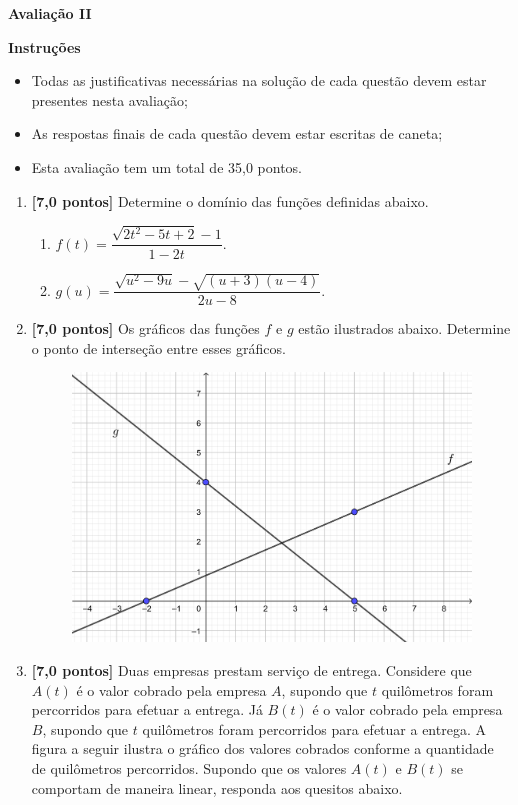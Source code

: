 \documentclass[12pt,a4paper]{article}
\begin{document}
\begin{center}
 \textbf{Avaliação II}
\end{center}

\textbf{Instruções}
\begin{itemize}
 \item Todas as justificativas necessárias na solução de cada questão devem estar presentes nesta avaliação;
 \item As respostas finais de cada questão devem estar escritas de caneta;
 \item Esta avaliação tem um total de 35,0 pontos.
\end{itemize}

\begin{enumerate}
  \item \textbf{[7,0 pontos]} Determine o domínio das funções definidas abaixo.
  \begin{enumerate}
    \item $f(t) = \dfrac{\sqrt{2t^2 - 5t + 2} - 1}{1 - 2t}$.
    \item $g(u) = \dfrac{\sqrt{u^2 - 9u} - \sqrt{(u + 3)(u - 4)}}{2u - 8}$.
  \end{enumerate}
  
  \item \textbf{[7,0 pontos]} Os gráficos das funções $f$ e $g$ estão ilustrados abaixo. Determine o ponto de interseção entre esses gráficos.
  
    \begin{figure}[H]
     \centering
     \includegraphics[scale=0.6]{figura/grafico-avaliacao-ii-cc-20-1.png}
    \end{figure}
  
  \item \textbf{[7,0 pontos]} Duas empresas prestam serviço de entrega. Considere que $A(t)$ é o valor
    cobrado pela empresa $A$, supondo que $t$ quilômetros foram percorridos para
    efetuar a entrega. Já $B(t)$ é o valor cobrado pela empresa $B$, supondo que
    $t$ quilômetros foram percorridos para efetuar a entrega. A figura a seguir
    ilustra o gráfico dos valores cobrados conforme a quantidade de quilômetros
    percorridos. Supondo que os valores $A(t)$ e $B(t)$ se comportam de maneira
    linear, responda aos quesitos abaixo.
  

\end{enumerate}
\end{document}

